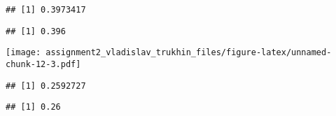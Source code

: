 \documentclass[
]{article}
\newenvironment{Shaded}{\begin{snugshade}}{\end{snugshade}}
\newcommand{\FunctionTok}[1]{\textcolor[rgb]{0.00,0.00,0.00}{#1}}
\newcommand{\NormalTok}[1]{#1}
\newcommand{\SpecialCharTok}[1]{\textcolor[rgb]{0.00,0.00,0.00}{#1}}
\begin{document}
\begin{Shaded}
\end{Shaded}

\begin{verbatim}
## [1] 0.3973417
\end{verbatim}

\begin{Shaded}
\end{Shaded}

\begin{verbatim}
## [1] 0.396
\end{verbatim}

\begin{Shaded}
\end{Shaded}

\texttt{[image: assignment2\_vladislav\_trukhin\_files/figure-latex/unnamed-chunk-12-3.pdf]}

\begin{Shaded}
\end{Shaded}

\begin{verbatim}
## [1] 0.2592727
\end{verbatim}

\begin{Shaded}
\end{Shaded}

\begin{verbatim}
## [1] 0.26
\end{verbatim}
\end{document}
